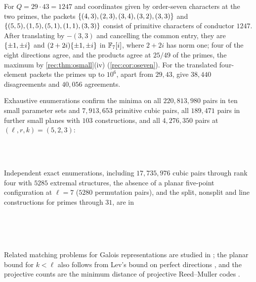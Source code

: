\begin{example}\label{rec:ex:oseptic}
For $Q=29\cdot43=1247$ and coordinates given by order-seven characters at the two primes, the packets
$\{(4,3),(2,3),(3,4),(3,2),(3,3)\}$ and $\{(5,5),(1,5),(5,1),(1,1),(3,3)\}$ consist of primitive characters of
conductor $1247$. After translating by $-(3,3)$ and cancelling the common entry, they are $\{\pm1,\pm i\}$ and
$(2+2i)\{\pm1,\pm i\}$ in $\mathbb{F}_7[i]$, where $2+2i$ has norm one; four of the eight directions agree, and the products
agree at $25/49$ of the primes, the maximum by \cref{rec:thm:osmall}(iv) (\cref{rec:cor:oseven}). For the translated four-element packets the
primes up to $10^6$, apart from $29,43$, give $38{,}440$ disagreements and $40{,}056$ agreements.
\end{example}

Exhaustive enumerations confirm the minima on all $220{,}813{,}980$ pairs in ten small parameter sets and
$7{,}913{,}653$ primitive cubic pairs, all $189{,}471$ pairs in further small planes with $103$ constructions, and all
$4{,}276{,}350$ pairs at $(\ell,r,k)=(5,2,3)$:
\begin{center}
\\
\\
\end{center}
Independent exact enumerations, including $17{,}735{,}976$ cubic pairs through rank four with $5285$ extremal
structures, the absence of a planar five-point configuration at $\ell=7$ ($5280$ permutation pairs), and the
split, nonsplit and line constructions for primes through $31$, are in
\begin{center}
\\
\\
\\
\end{center}
Related matching problems for Galois representations are studied in \cite{Walji2016Matching}; the planar bound
for $k<\ell$ also follows from Lev's bound on perfect directions \cite{Lev2020Point}, and the projective
counts are the minimum distance of projective Reed--Muller codes \cite{GhorpadeLudhani2024Minimum}.

